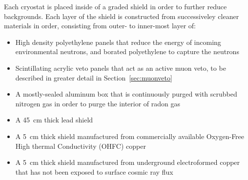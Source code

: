 \documentclass[/main.tex]{subfiles}
\begin{document}
Each cryostat is placed inside of a graded shield in order to further reduce backgrounds.
Each layer of the shield is constructed from successiveley cleaner materials in order, consisting from outer- to inner-most layer of:
\begin{itemize}
\item High density polyethylene panels that reduce the energy of incoming environmental neutrons, and borated polyethylene to capture the neutrons
\item Scintillating acrylic veto panels that act as an active muon veto, to be described in greater detail in Section~\ref{sec:muonveto}
\item A mostly-sealed aluminum box that is continuously purged with scrubbed nitrogen gas in order to purge the interior of radon gas
\item A 45~cm thick lead shield
\item A 5~cm thick shield manufactured from commercially available Oxygen-Free High thermal Conductivity (OHFC) copper
\item A 5~cm thick shield manufactured from underground electroformed copper that has not been exposed to surface cosmic ray flux
\end{itemize}
\end{document}
